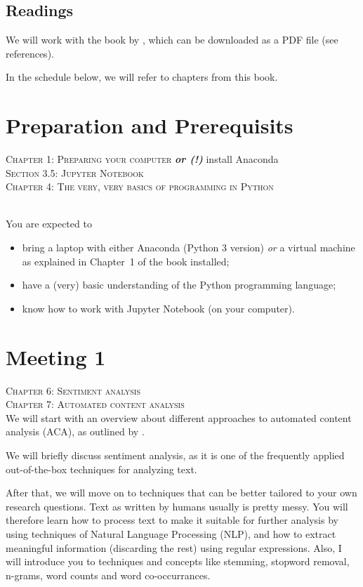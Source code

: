 \documentclass[a4paper,12pt]{report}
\begin{document}
\subsection*{Readings}
We will work with the book by \cite{Trilling2016}, which can be downloaded as a PDF file (see references).


In the schedule below, we will refer to chapters from this book.


\section*{Preparation and Prerequisits}
\textsc{ Chapter 1: Preparing your computer} \textbf{\emph{or (!)}} install Anaconda\\
\textsc{ Section 3.5: Jupyter Notebook} \\
\textsc{ Chapter 4: The very, very basics of programming in Python}

~\\
You are expected to
\begin{itemize}
	\item bring a laptop with either Anaconda (Python 3 version) \emph{or} a virtual machine as explained in Chapter~1 of the book installed;
	\item have a (very) basic understanding of the Python programming language;
	\item know how to work with Jupyter Notebook (on your computer).
\end{itemize}




\section*{Meeting 1}
\textsc{ Chapter 6: Sentiment analysis}\\
\textsc{ Chapter 7: Automated content analysis}\\

We will start with an overview about different approaches to automated content analysis (ACA), as outlined by \cite{Boumans2016}. 

We will briefly discuss sentiment analysis, as it is one of the frequently applied out-of-the-box techniques for analyzing text.

After that, we will move on to techniques that can be better tailored to your own research questions. Text as written by humans usually is pretty messy. You will therefore learn how to process text to make it suitable for further analysis by using techniques of Natural Language Processing (NLP), and how to extract meaningful information (discarding the rest) using regular expressions. Also, I will introduce you to techniques and concepts like stemming, stopword removal, n-grams, word counts and word co-occurrances.
\end{document}
